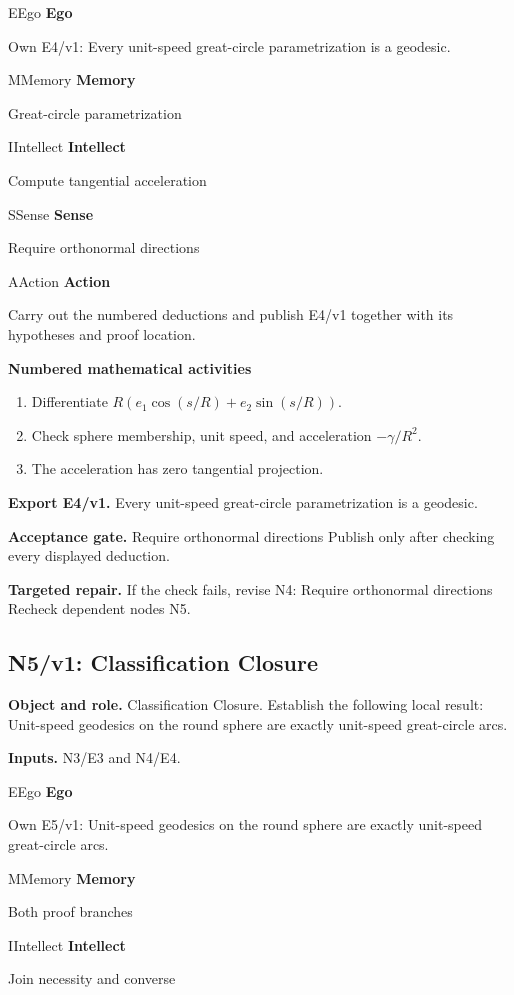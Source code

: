 \documentclass[preprint,12pt,aps,pra,showkeys,amsmath,amssymb,superscriptaddress,floatfix]{revtex4-2}
\theoremstyle{definition}
\theoremstyle{remark}
\newcommand{\mmfaculty}[3]{%
 \begin{mmfacultybox}{#1}{#2}
 {\sffamily\bfseries\color{MMBlue}#2}\par\smallskip #3
 \end{mmfacultybox}}
\newcommand{\field}[2]{\par\smallskip\noindent\textbf{#1.} #2\par}
\begin{document}
\mmfaculty{E}{Ego}{Own E4/v1: Every unit-speed great-circle parametrization is a geodesic.}

\mmfaculty{M}{Memory}{Great-circle parametrization}

\mmfaculty{I}{Intellect}{Compute tangential acceleration}

\mmfaculty{S}{Sense}{Require orthonormal directions}

\mmfaculty{A}{Action}{Carry out the numbered deductions and publish E4/v1 together with its
hypotheses and proof location.}

\smallskip\noindent\textbf{Numbered mathematical activities}

\begin{enumerate}[label=N4.\arabic*,leftmargin=3.4em]

\item Differentiate \(R(e_1\cos(s/R)+e_2\sin(s/R))\).

\item Check sphere membership, unit speed, and acceleration \(-\gamma/R^2\).

\item The acceleration has zero tangential projection.

\end{enumerate}

\field{Export E4/v1}{Every unit-speed great-circle parametrization is a geodesic.}

\field{Acceptance gate}{Require orthonormal directions Publish only after checking every
displayed deduction.}

\field{Targeted repair}{If the check fails, revise N4: Require orthonormal directions Recheck
dependent nodes N5.}

\clearpage

\subsection{N5/v1: Classification Closure}

\field{Object and role}{Classification Closure. Establish the following local result: Unit-speed
geodesics on the round sphere are exactly unit-speed great-circle arcs.}

\field{Inputs}{N3/E3 and N4/E4.}

\mmfaculty{E}{Ego}{Own E5/v1: Unit-speed geodesics on the round sphere are exactly
unit-speed great-circle arcs.}

\mmfaculty{M}{Memory}{Both proof branches}

\mmfaculty{I}{Intellect}{Join necessity and converse}
\end{document}
